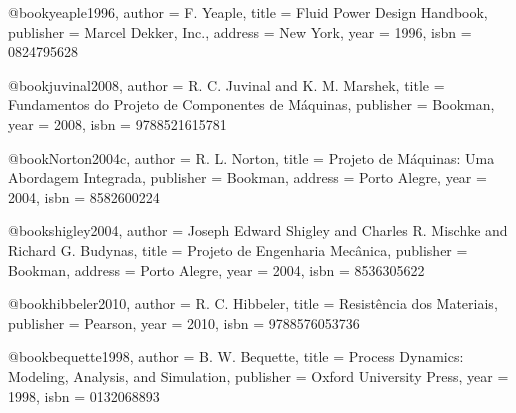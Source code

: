 @book{yeaple1996,
  author = {F. Yeaple},
  title = {Fluid Power Design Handbook},
  publisher = {Marcel Dekker, Inc.},
  address = {New York},
  year = {1996},
  isbn = {0824795628}
}


%

@book{juvinal2008,
  author = {R. C. Juvinal and K. M. Marshek},
  title = {Fundamentos do Projeto de Componentes de Máquinas},
  publisher = {Bookman},
  year = {2008},
  isbn = {9788521615781}
}

@book{Norton2004c,
  author = {R. L. Norton},
  title = {Projeto de Máquinas: Uma Abordagem Integrada},
  publisher = {Bookman},
  address = {Porto Alegre},
  year = {2004},
  isbn = {8582600224}
}

@book{shigley2004,
  author = {Joseph Edward Shigley and Charles R. Mischke and Richard G. Budynas},
  title = {Projeto de Engenharia Mecânica},
  publisher = {Bookman},
  address = {Porto Alegre},
  year = {2004},
  isbn = {8536305622}
}

@book{hibbeler2010,
  author = {R. C. Hibbeler},
  title = {Resistência dos Materiais},
  publisher = {Pearson},
  year = {2010},
  isbn = {9788576053736}
}

%

@book{bequette1998,
  author = {B. W. Bequette},
  title = {Process Dynamics: Modeling, Analysis, and Simulation},
  publisher = {Oxford University Press},
  year = {1998},
  isbn = {0132068893}
}

